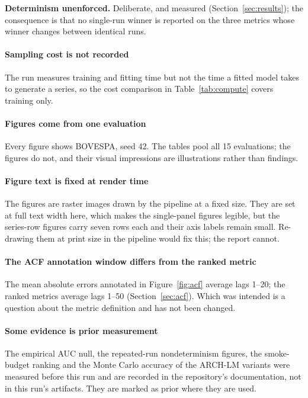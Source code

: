 \documentclass[11pt,a4paper]{article}
\makeatletter
\DeclareRobustCommand{\_}{\ifmmode\nfss@text{\textunderscore}\else\textunderscore\allowbreak\fi}
\makeatother
\begin{document}
\textbf{Determinism unenforced.} Deliberate, and measured (Section~\ref{sec:results}); the consequence is that no single-run winner is reported on the three metrics whose winner changes between identical runs.

\paragraph{Sampling cost is not recorded} The run measures training and fitting time but not the time a fitted model takes to generate a series, so the cost comparison in Table~\ref{tab:compute} covers training only.

\paragraph{Figures come from one evaluation} Every figure shows BOVESPA, seed 42. The tables pool all 15 evaluations; the figures do not, and their visual impressions are illustrations rather than findings.

\paragraph{Figure text is fixed at render time} The figures are raster images drawn by the pipeline at a fixed size. They are set at full text width here, which makes the single-panel figures legible, but the series-row figures carry seven rows each and their axis labels remain small. Re-drawing them at print size in the pipeline would fix this; the report cannot.

\paragraph{The ACF annotation window differs from the ranked metric} The mean absolute errors annotated in Figure~\ref{fig:acf} average lags 1--20; the ranked metrics average lags 1--50 (Section~\ref{sec:acf}). Which was intended is a question about the metric definition and has not been changed.

\paragraph{Some evidence is prior measurement} The empirical AUC null, the repeated-run nondeterminism figures, the smoke-budget ranking and the Monte Carlo accuracy of the ARCH-LM variants were measured before this run and are recorded in the repository's documentation, not in this run's artifacts. They are marked as prior where they are used.
\end{document}
